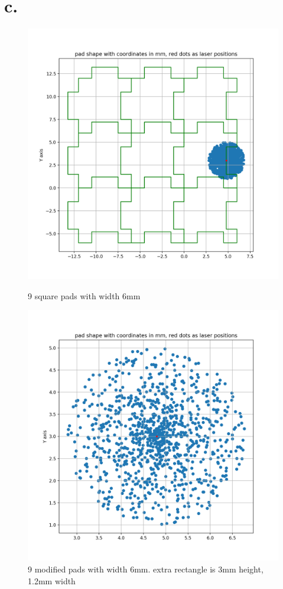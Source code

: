 \documentclass{article}
\begin{document}
\section{c. }
\begin{figure}
  \centering
  \begin{minipage}[b]{0.4\textwidth}
    \includegraphics[width=\textwidth]{fig3_a.png}
    \caption{9 square pads with width 6mm}
  \end{minipage}
  \hfill
  \begin{minipage}[b]{0.4\textwidth}
    \includegraphics[width=\textwidth]{fig3_b.png}
    \caption{9 modified pads with width 6mm. extra rectangle is 3mm height, 1.2mm width}
  \end{minipage}
\end{figure}
\end{document}
